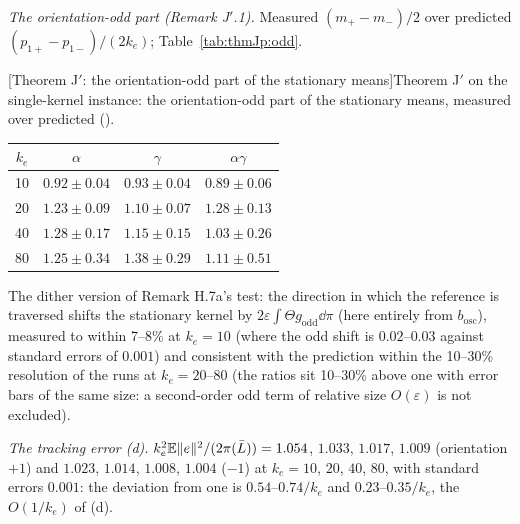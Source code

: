 \smallskip
\noindent\emph{The orientation-odd part (Remark J$'$.1).} Measured $(m_+ - m_-)/2$ over predicted
$(p_{1+} - p_{1-})/(2k_e)$; Table~\ref{tab:thmJp:odd}.

\medskip
\noindent\begin{minipage}{\textwidth}
\centering\footnotesize
{}[Theorem J$'$: the orientation-odd part of the stationary means]{Theorem J$'$ on the single-kernel
instance: the orientation-odd part of the stationary means, measured over predicted
().}
\label{tab:thmJp:odd}
\begin{tabular}{@{}cccc@{}}
\toprule
$k_e$ & $\alpha$ & $\gamma$ & $\alpha\gamma$\\
\midrule
10 & $0.92\pm0.04$ & $0.93\pm0.04$ & $0.89\pm0.06$\\
20 & $1.23\pm0.09$ & $1.10\pm0.07$ & $1.28\pm0.13$\\
40 & $1.28\pm0.17$ & $1.15\pm0.15$ & $1.03\pm0.26$\\
80 & $1.25\pm0.34$ & $1.38\pm0.29$ & $1.11\pm0.51$\\
\bottomrule
\end{tabular}
\end{minipage}
\medskip

The dither version of Remark H.7a's test: the direction in which the reference is traversed shifts the stationary
kernel by $2\varepsilon\int\Theta g_{\mathrm{odd}}\dd\pi$ (here entirely from $b_{\mathrm{osc}}$), measured to within
7--8\% at $k_e = 10$ (where the odd shift is $0.02$--$0.03$ against standard errors of $0.001$) and consistent with
the prediction within the 10--30\% resolution of the runs at $k_e = 20$--$80$ (the ratios sit 10--30\% above one
with error bars of the same size: a second-order odd term of relative size $O(\varepsilon)$ is not excluded).

\smallskip
\noindent\emph{The tracking error (d).} $k_e^2\mathbb{E}\lVert e\rVert^2/(2\pi(\bar L)) = 1.054$, $1.033$, $1.017$, $1.009$
(orientation $+1$) and $1.023$, $1.014$, $1.008$, $1.004$ ($-1$) at $k_e = 10$, $20$, $40$, $80$, with standard
errors $0.001$: the deviation from one is $0.54$--$0.74/k_e$ and $0.23$--$0.35/k_e$, the $O(1/k_e)$ of (d).

